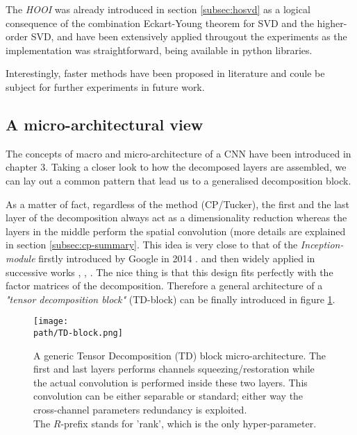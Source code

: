 The \emph{HOOI} was already introduced in section \ref{subsec:hosvd} as a logical consequence of the combination Eckart-Young theorem for SVD and the higher-order SVD, and have been extensively applied througout the experiments as the implementation was straightforward, being available in python libraries. 
\newline 

Interestingly, faster methods have been proposed in literature \parencite{tucker-fast1} \parencite{tucker-fast2} and coule be subject for further experiments in future work.

\newpage 
\subsection{A micro-architectural view}
The concepts of macro and micro-architecture of a CNN have been introduced in chapter 3. Taking a closer look to how the decomposed layers are assembled, we can lay out a common pattern that lead us to a generalised decomposition block. 
\newline 

As a matter of fact, regardless of the method (CP/Tucker), the first and the last layer of the decomposition always act as a dimensionality reduction whereas the layers in the middle perform the spatial convolution (more details are explained in section \ref{subsec:cp-summary}. This idea is very close to that of the \emph{Inception-module} firstly introduced by Google in 2014 \parencite{googlenet}. and then widely applied in successive works \parencite{squeeznet}, \parencite{chollet}, \parencite{mobilenets}.  
\newline
The nice thing is that this design fits perfectly with the factor matrices of the decomposition.  
Therefore a general architecture of a \emph{"tensor decomposition block"} (TD-block) can be finally introduced in figure \ref{fig:TD-block}.

\begin{figure}[h!]
 \centering
 \texttt{[image: \\path/TD-block.png]} 
 \caption[Generic tensor decomposition (TD) block.]{A generic Tensor Decomposition (TD) block micro-architecture. The first and last layers performs channels squeezing/restoration while the actual convolution is performed inside these two layers. This convolution can be either separable or standard; either way the cross-channel parameters redundancy is exploited.\\ The $R$-prefix stands for 'rank', which is the only hyper-parameter.}
 \label{fig:TD-block}
\end{figure}

